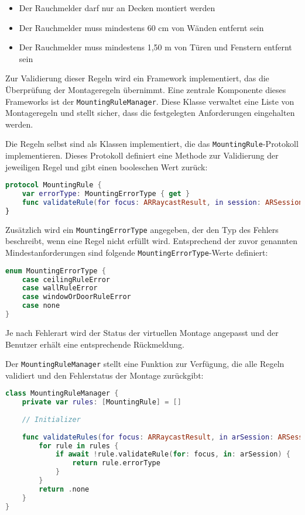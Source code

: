 \begin{itemize}
    \item Der Rauchmelder darf nur an Decken montiert werden
    \item Der Rauchmelder muss mindestens 60 cm von Wänden entfernt sein
    \item Der Rauchmelder muss mindestens 1,50 m von Türen und Fenstern entfernt sein
\end{itemize}

Zur Validierung dieser Regeln wird ein Framework implementiert, das die Überprüfung der Montageregeln übernimmt. Eine zentrale Komponente dieses Frameworks ist der \texttt{MountingRuleManager}. Diese Klasse verwaltet eine Liste von Montageregeln und stellt sicher, dass die festgelegten Anforderungen eingehalten werden.

Die Regeln selbst sind als Klassen implementiert, die das \texttt{MountingRule}-Protokoll implementieren. Dieses Protokoll definiert eine Methode zur Validierung der jeweiligen Regel und gibt einen booleschen Wert zurück:

\begin{lstlisting}[language=Swift]
protocol MountingRule {
    var errorType: MountingErrorType { get }
    func validateRule(for focus: ARRaycastResult, in session: ARSession) async -> Bool
}
\end{lstlisting}

Zusätzlich wird ein \texttt{MountingErrorType} angegeben, der den Typ des Fehlers beschreibt, wenn eine Regel nicht erfüllt wird. Entsprechend der zuvor genannten Mindestanforderungen sind folgende \texttt{MountingErrorType}-Werte definiert:

\begin{lstlisting}[language=Swift]
enum MountingErrorType {
    case ceilingRuleError
    case wallRuleError
    case windowOrDoorRuleError
    case none
}
\end{lstlisting}

Je nach Fehlerart wird der Status der virtuellen Montage angepasst und der Benutzer erhält eine entsprechende Rückmeldung.

Der \texttt{MountingRuleManager} stellt eine Funktion zur Verfügung, die alle Regeln validiert und den Fehlerstatus der Montage zurückgibt:


\begin{lstlisting}[language=Swift]
class MountingRuleManager {
    private var rules: [MountingRule] = []
    
    // Initializer
    
    func validateRules(for focus: ARRaycastResult, in arSession: ARSession) async -> errorType: MountingErrorType {
        for rule in rules {
            if await !rule.validateRule(for: focus, in: arSession) {
                return rule.errorType
            }
        }
        return .none
    }
}
\end{lstlisting}

